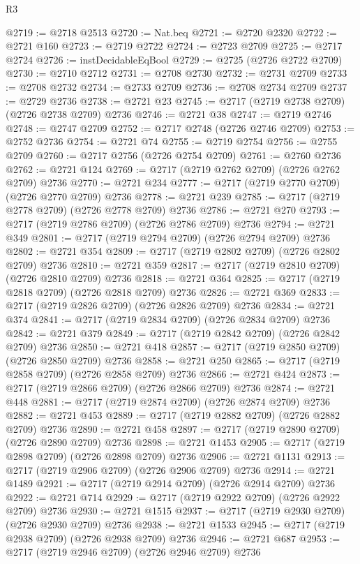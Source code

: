 \begin{lexlean}{R3}
\begin{coremodule}
@2719 := @2718 @2513
@2720 := Nat.beq
@2721 := @2720 @2320
@2722 := @2721 @160
@2723 := @2719 @2722
@2724 := @2723 @2709
@2725 := @2717 @2724
@2726 := instDecidableEqBool
@2729 := @2725 (@2726 @2722 @2709)
@2730 := @2710 @2712
@2731 := @2708 @2730
@2732 := @2731 @2709
@2733 := @2708 @2732
@2734 := @2733 @2709
@2736 := @2708 @2734 @2709
@2737 := @2729 @2736
@2738 := @2721 @23
@2745 := @2717 (@2719 @2738 @2709) (@2726 @2738 @2709) @2736
@2746 := @2721 @38
@2747 := @2719 @2746
@2748 := @2747 @2709
@2752 := @2717 @2748 (@2726 @2746 @2709)
@2753 := @2752 @2736
@2754 := @2721 @74
@2755 := @2719 @2754
@2756 := @2755 @2709
@2760 := @2717 @2756 (@2726 @2754 @2709)
@2761 := @2760 @2736
@2762 := @2721 @124
@2769 := @2717 (@2719 @2762 @2709) (@2726 @2762 @2709) @2736
@2770 := @2721 @234
@2777 := @2717 (@2719 @2770 @2709) (@2726 @2770 @2709) @2736
@2778 := @2721 @239
@2785 := @2717 (@2719 @2778 @2709) (@2726 @2778 @2709) @2736
@2786 := @2721 @270
@2793 := @2717 (@2719 @2786 @2709) (@2726 @2786 @2709) @2736
@2794 := @2721 @349
@2801 := @2717 (@2719 @2794 @2709) (@2726 @2794 @2709) @2736
@2802 := @2721 @354
@2809 := @2717 (@2719 @2802 @2709) (@2726 @2802 @2709) @2736
@2810 := @2721 @359
@2817 := @2717 (@2719 @2810 @2709) (@2726 @2810 @2709) @2736
@2818 := @2721 @364
@2825 := @2717 (@2719 @2818 @2709) (@2726 @2818 @2709) @2736
@2826 := @2721 @369
@2833 := @2717 (@2719 @2826 @2709) (@2726 @2826 @2709) @2736
@2834 := @2721 @374
@2841 := @2717 (@2719 @2834 @2709) (@2726 @2834 @2709) @2736
@2842 := @2721 @379
@2849 := @2717 (@2719 @2842 @2709) (@2726 @2842 @2709) @2736
@2850 := @2721 @418
@2857 := @2717 (@2719 @2850 @2709) (@2726 @2850 @2709) @2736
@2858 := @2721 @250
@2865 := @2717 (@2719 @2858 @2709) (@2726 @2858 @2709) @2736
@2866 := @2721 @424
@2873 := @2717 (@2719 @2866 @2709) (@2726 @2866 @2709) @2736
@2874 := @2721 @448
@2881 := @2717 (@2719 @2874 @2709) (@2726 @2874 @2709) @2736
@2882 := @2721 @453
@2889 := @2717 (@2719 @2882 @2709) (@2726 @2882 @2709) @2736
@2890 := @2721 @458
@2897 := @2717 (@2719 @2890 @2709) (@2726 @2890 @2709) @2736
@2898 := @2721 @1453
@2905 := @2717 (@2719 @2898 @2709) (@2726 @2898 @2709) @2736
@2906 := @2721 @1131
@2913 := @2717 (@2719 @2906 @2709) (@2726 @2906 @2709) @2736
@2914 := @2721 @1489
@2921 := @2717 (@2719 @2914 @2709) (@2726 @2914 @2709) @2736
@2922 := @2721 @714
@2929 := @2717 (@2719 @2922 @2709) (@2726 @2922 @2709) @2736
@2930 := @2721 @1515
@2937 := @2717 (@2719 @2930 @2709) (@2726 @2930 @2709) @2736
@2938 := @2721 @1533
@2945 := @2717 (@2719 @2938 @2709) (@2726 @2938 @2709) @2736
@2946 := @2721 @687
@2953 := @2717 (@2719 @2946 @2709) (@2726 @2946 @2709) @2736

\end{coremodule}
\end{lexlean}
